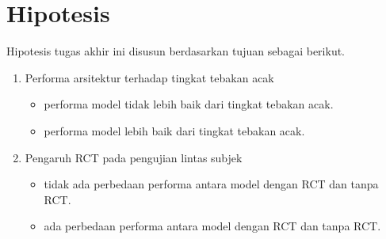 \section{Hipotesis}
\label{sec:hipotesis}
Hipotesis tugas akhir ini disusun berdasarkan tujuan sebagai berikut.
\begin{enumerate}
    \item Performa arsitektur terhadap tingkat tebakan acak
    \begin{itemize}
        \item[$H_0$:] performa model tidak lebih baik dari tingkat tebakan acak.
        \item[$H_1$:] performa model lebih baik dari tingkat tebakan acak.
    \end{itemize}
    \item Pengaruh RCT pada pengujian lintas subjek
    \begin{itemize}
        \item[$H_0$:] tidak ada perbedaan performa antara model dengan RCT dan tanpa RCT.
        \item[$H_1$:] ada perbedaan performa antara model dengan RCT dan tanpa RCT.
    \end{itemize}
\end{enumerate}

